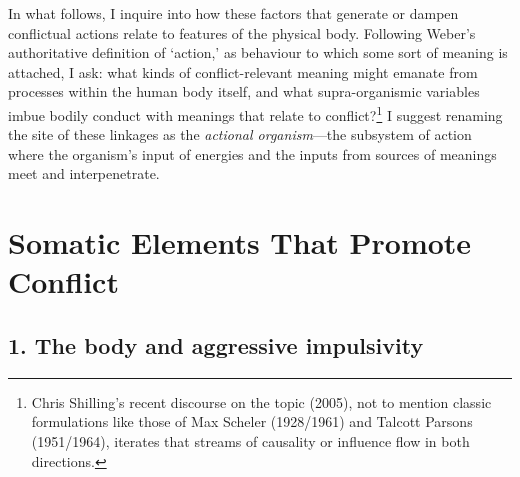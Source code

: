 In what follows, I inquire into how these factors that generate or dampen conflictual actions relate to features of the physical body. Following Weber's authoritative definition of `action,' as behaviour to which some sort of meaning is attached, I ask: what kinds of conflict-relevant meaning might emanate from processes within the human body itself, and what supra-organismic variables imbue bodily conduct with meanings that relate to conflict?\footnote{Chris Shilling's recent discourse on the topic (2005), not to mention classic formulations like those of Max Scheler (1928/1961) and Talcott Parsons (1951/1964), iterates that streams of causality or influence flow in both directions.} I suggest renaming the site of these linkages as the \emph{actional organism}---the subsystem of action where the organism's input of energies and the inputs from sources of meanings meet and interpenetrate.

\section*{Somatic Elements That Promote Conflict}

\subsection*{1. The body and aggressive impulsivity}

